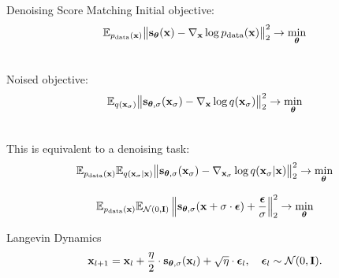 \documentclass{beamer}
\renewcommand{\eqpause}{}
\begin{document}
\begin{frame}{Denoising Score Matching}
	Initial objective:
	\vspace{-0.2cm}
	\[
		\mathbb{E}_{p_{\text{data}}(\mathbf{x})}\big\| \mathbf{s}_{\boldsymbol{\theta}}(\mathbf{x}) - \nabla_{\mathbf{x}} \log p_{\text{data}}(\mathbf{x}) \big\|^2_2 \rightarrow \min_{\boldsymbol{\theta}}
	\]
	\eqpause
	\vspace{-0.5cm} \\
	Noised objective:
	\vspace{-0.2cm}
	\[
		\mathbb{E}_{q(\mathbf{x}_{\sigma})}\big\| \mathbf{s}_{\boldsymbol{\theta}, \sigma}(\mathbf{x}_\sigma) - \nabla_{\mathbf{x}} \log q(\mathbf{x}_{\sigma}) \big\|^2_2 \rightarrow \min_{\boldsymbol{\theta}}
	\]
	\eqpause
	\vspace{-0.5cm} \\
	This is equivalent to a denoising task:
	\vspace{-0.2cm}
	\[
		\mathbb{E}_{p_{\text{data}}(\mathbf{x})} \mathbb{E}_{q(\mathbf{x}_{\sigma} | \mathbf{x})}\big\| \mathbf{s}_{\boldsymbol{\theta}, \sigma}(\mathbf{x}_{\sigma}) - \nabla_{\mathbf{x}_{\sigma}} \log q(\mathbf{x}_{\sigma} | \mathbf{x}) \big\|^2_2 \rightarrow \min_{\boldsymbol{\theta}}
	\]
	\eqpause
	\vspace{-0.3cm}
	\[
		\mathbb{E}_{p_{\text{data}}(\mathbf{x})} \mathbb{E}_{\mathcal{N}(0, \mathbf{I})}\left\| \mathbf{s}_{\boldsymbol{\theta}, \sigma}(\mathbf{x} + \sigma \cdot \boldsymbol{\epsilon}) + \frac{\boldsymbol{\epsilon}}{\sigma} \right\|^2_2 \rightarrow \min_{\boldsymbol{\theta}}
	\]
	\vspace{-0.5cm}
	\begin{block}{Langevin Dynamics}
		\vspace{-0.3cm}
		\[
			\mathbf{x}_{l + 1} = \mathbf{x}_l + \frac{\eta}{2} \cdot \mathbf{s}_{\boldsymbol{\theta}, \sigma}(\mathbf{x}_l) + \sqrt{\eta} \cdot \boldsymbol{\epsilon}_l, \quad \boldsymbol{\epsilon}_l \sim \mathcal{N}(0, \mathbf{I}).
		\]
		\vspace{-0.7cm}
	\end{block}
\end{frame}
\end{document}
